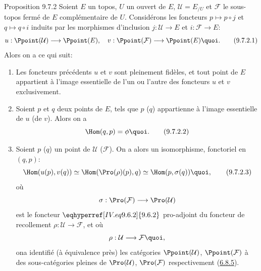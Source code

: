 \begin{enonce*}{Proposition 9.7.2}
Soient $E$ un topos, $U$ un ouvert de $E$, $\mathcal{U}=E_{/U}$ et
$\mathcal{F}$ le sous-topos fermé de $E$ complémentaire de $U$.
Considérons les foncteurs $p\mapsto p\circ j$ et $q\mapsto q\circ i$
induits par les morphismes d'inclusion $j:\mathcal{U}\rightarrow E$
et $i:\mathcal{F} \rightarrow E$:
\begin{equation*}
u:\Ppoint(\mathcal{U})\longrightarrow \Ppoint(E),\quad
v:\Ppoint(\mathcal{F})\longrightarrow
\Ppoint(E){\quoi}.\tag{9.7.2.1}
\end{equation*}
Alors on a ce qui suit:
\begin{enumerate}
\renewcommand{\theenumi}{\alph{enumi}}
\renewcommand{\labelenumi}{\theenumi)}
\item Les foncteurs précédents $u$ et $v$ sont pleinement fidèles, et
tout point de $E$ appartient à l'image essentielle de l'un ou
l'autre des foncteurs $u$ et $v$ exclusivement.

\item Soient $p$ et $q$ deux points de $E$, tels que $p$ (\resp $q$)
appartienne à l'image essentielle de $u$ (\resp de $v$). Alors on a
\begin{equation*}
\Hom(q,p)=\phi{\quoi}.\tag{9.7.2.2}
\end{equation*}

\item Soient $p$ (\resp $q$) un point de $\mathcal{U}$ (\resp $\mathcal{F}$). On a
alors un isomorphisme, fonctoriel en $(q,p)$:
\begin{equation*}
\Hom(u(p),v(q))\simeq \Hom(\Pro(\rho)(p),q)\simeq
\Hom(p,\sigma(q)){\quoi},\tag{9.7.2.3}
\end{equation*}
où
$$
\sigma:\Pro(\mathcal{F})\longrightarrow \Pro(\mathcal{U})
$$
est le foncteur $\eqhyperref[IV.eq9.6.2]{9.6.2}$ pro-adjoint du foncteur de
recollement $\rho:\mathcal{U}\rightarrow \mathcal{F}$, et où
$$
\rho:\mathcal{U}\longrightarrow \mathcal{F}{\quoi},
$$
on\pageoriginale a identifié (à équivalence près) les catégories
$\Ppoint(\mathcal{U})$, $\Ppoint(\mathcal{F})$ à des sous-catégories
pleines de $\Pro(\mathcal{U})$, $\Pro(\mathcal{F})$ respectivement
(\hyperref[IV.subsubsec6.8.5]{6.8.5}).
\end{enumerate}
\end{enonce*}

